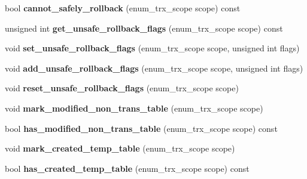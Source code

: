 \begin{DoxyCompactItemize}
\item 
\mbox{\label{classTransaction__ctx_a1e9b5f7a45e9ea2ea86ba0e557b02046}} 
bool {\bfseries cannot\+\_\+safely\+\_\+rollback} (enum\+\_\+trx\+\_\+scope scope) const
\item 
\mbox{\label{classTransaction__ctx_aaad51caa6d7baa45c52b7ebbd373bdca}} 
unsigned int {\bfseries get\+\_\+unsafe\+\_\+rollback\+\_\+flags} (enum\+\_\+trx\+\_\+scope scope) const
\item 
\mbox{\label{classTransaction__ctx_a8e6fd8b4bfaecee0326251813efbf99f}} 
void {\bfseries set\+\_\+unsafe\+\_\+rollback\+\_\+flags} (enum\+\_\+trx\+\_\+scope scope, unsigned int flags)
\item 
\mbox{\label{classTransaction__ctx_abfdcadb2df0a6183f73dc72a2f72bbe0}} 
void {\bfseries add\+\_\+unsafe\+\_\+rollback\+\_\+flags} (enum\+\_\+trx\+\_\+scope scope, unsigned int flags)
\item 
\mbox{\label{classTransaction__ctx_a49e620eae77d6ec23a96c7387c18366e}} 
void {\bfseries reset\+\_\+unsafe\+\_\+rollback\+\_\+flags} (enum\+\_\+trx\+\_\+scope scope)
\item 
\mbox{\label{classTransaction__ctx_aadcec37c4bfa987a35296ab2ca23bc79}} 
void {\bfseries mark\+\_\+modified\+\_\+non\+\_\+trans\+\_\+table} (enum\+\_\+trx\+\_\+scope scope)
\item 
\mbox{\label{classTransaction__ctx_ae27b9f33f9461cbdb9b86273fa49d209}} 
bool {\bfseries has\+\_\+modified\+\_\+non\+\_\+trans\+\_\+table} (enum\+\_\+trx\+\_\+scope scope) const
\item 
\mbox{\label{classTransaction__ctx_acbc5fbada378f6efd891f8b098c31820}} 
void {\bfseries mark\+\_\+created\+\_\+temp\+\_\+table} (enum\+\_\+trx\+\_\+scope scope)
\item 
\mbox{\label{classTransaction__ctx_a0f968097576a7bc5e5322d15d44d5959}} 
bool {\bfseries has\+\_\+created\+\_\+temp\+\_\+table} (enum\+\_\+trx\+\_\+scope scope) const
\item 

\end{DoxyCompactItemize}
